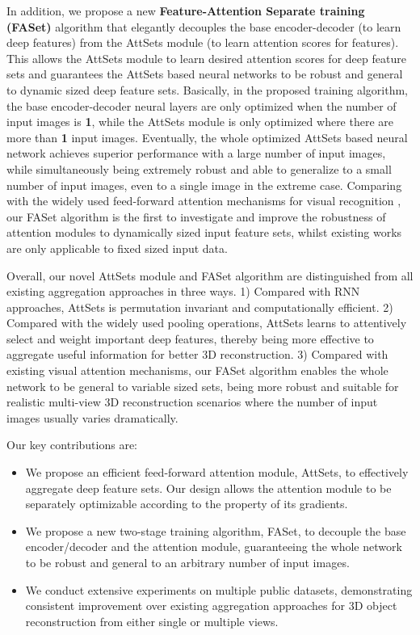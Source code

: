 \documentclass[twocolumn]{svjour3}    \pdfoutput=1
\newcommand{\nickname}{AttSets}
\newcommand{\faset}{FASet}
\newcommand{\rev}{}
\begin{document}
\rev{In addition, we propose a new \textbf{Feature-Attention Separate training (FASet)} algorithm that elegantly decouples the base encoder-decoder (to learn deep features) from the \nickname{} module (to learn attention scores for features). This allows the \nickname{} module to learn desired attention scores for deep feature sets and guarantees the \nickname{} based neural networks to be robust and general to dynamic sized deep feature sets.}
Basically, in the proposed training algorithm, the base encoder-decoder neural layers are only optimized when the number of input images is \textbf{1}, while the \nickname{} module is only optimized where there are more than \textbf{1} input images. Eventually, the whole optimized \nickname{} based neural network achieves superior performance with a large number of input images, while simultaneously being extremely robust and able to generalize to a small number of input images, even to a single image in the extreme case. \rev{Comparing with the widely used feed-forward attention mechanisms for visual recognition} \citep{JieHu2018,Rodriguez2018,Liu2018e,Sarafianos2018,Girdhar2017a}, \rev{our \faset{} algorithm is the first to investigate and improve the robustness of attention modules to dynamically sized input feature sets, whilst existing works are only applicable to fixed sized input data.}

\rev{Overall, our novel \nickname{} module and \faset{} algorithm are distinguished from all existing aggregation approaches in three ways. 1) Compared with RNN approaches, \nickname{} is permutation invariant and computationally efficient. 2) Compared with the widely used pooling operations, \nickname{} learns to attentively select and weight important deep features, thereby being more effective to aggregate useful information for better 3D reconstruction. 3) Compared with existing visual attention mechanisms, our \faset{} algorithm enables the whole network to be general to variable sized sets, being more robust and suitable for realistic multi-view 3D reconstruction scenarios where the number of input images usually varies dramatically.

Our key contributions are:}

\vspace{-0.15cm}
\begin{itemize}[leftmargin=0.4cm]
\item \rev{We propose an efficient feed-forward attention module, \nickname{}, to effectively aggregate deep feature sets. Our design allows the attention module to be separately optimizable according to the property of its gradients. }

\item \rev{We propose a new two-stage training algorithm, \faset{}, to decouple the base encoder/decoder and the attention module, guaranteeing the whole network to be robust and general to an arbitrary number of input images.}

\item \rev{We conduct extensive experiments on multiple public datasets, demonstrating consistent improvement over existing aggregation approaches for 3D object reconstruction from either single or multiple views.
}
\end{itemize}
\end{document}
